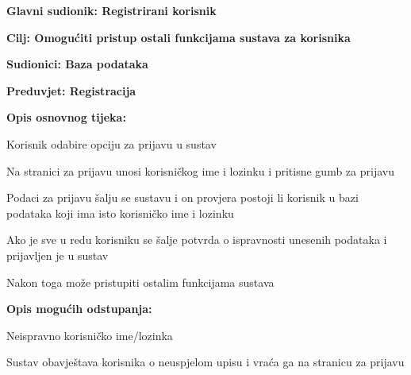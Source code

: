 				
				\noindent {}
				\begin{packed_item}
					
					\item \textbf{Glavni sudionik: Registrirani korisnik}
					\item  \textbf{Cilj: Omogućiti pristup ostali funkcijama sustava za korisnika} 
					\item  \textbf{Sudionici: Baza podataka} 
					\item  \textbf{Preduvjet: Registracija} 
					\item  \textbf{Opis osnovnog tijeka: }
					
					\item[] \begin{packed_enum}
						\item Korisnik odabire opciju za prijavu u sustav
						\item Na stranici za prijavu unosi korisničkog ime i lozinku i pritisne gumb za prijavu
						\item Podaci za prijavu šalju se sustavu i on provjera postoji li korisnik u bazi podataka koji ima isto korisničko ime i lozinku 
						\item Ako je sve u redu korisniku se šalje potvrda o ispravnosti unesenih podataka i prijavljen je u sustav
						\item Nakon toga može pristupiti ostalim funkcijama sustava
						
					\end{packed_enum}
					
					\item  \textbf{Opis mogućih odstupanja:}
					
					\item[] \begin{packed_item}
						
						\item[2.a] Neispravno korisničko ime/lozinka
						\item[] \begin{packed_enum}
							
							\item  Sustav obavještava korisnika o neuspjelom upisu i vraća ga na stranicu za prijavu
							
							
						\end{packed_enum}
						
						
					\end{packed_item}
				\end{packed_item}
				
